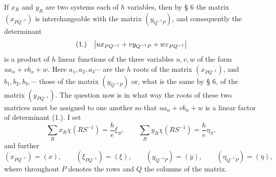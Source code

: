 \documentclass[11pt]{article}
\makeatletter
\newcommand{\frobtagc}[2]{\[\begin{array}{@{}r@{\quad}c@{}}\textup{(#1)} & \displaystyle #2\end{array}\]}
\makeatother
\begin{document}
If $x_R$ and $y_R$ are two systems each of $h$ variables, then by § 6 the matrix $(x_{PQ^{-1}})$ is interchangeable with the matrix $(y_{Q^{-1}P})$, and consequently the determinant
\frobtagc{1.}{\left|ux_{PQ^{-1}}+vy_{Q^{-1}P}+w\varepsilon_{PQ^{-1}}\right|}
is a product of $h$ linear functions of the three variables $u,v,w$ of the form $ua_\alpha+vb_\alpha+w$. Here $a_1,a_2,a_3\cdots$ are the $h$ roots of the matrix $(x_{PQ^{-1}})$, and $b_1,b_2,b_3,\cdots$ those of the matrix $(y_{Q^{-1}P})$ or, what is the same by § 6, of the matrix $(y_{PQ^{-1}})$. The question now is in what way the roots of these two matrices must be assigned to one another so that $ua_\alpha+vb_\alpha+w$ is a linear factor of determinant (1.). I set
\[
\sum_R x_R\chi(RS^{-1})=\frac{h}{e}\xi_S,
\qquad
\sum_R y_R\chi(RS^{-1})=\frac{h}{e}\eta_S,
\]
and further
\[
(x_{PQ^{-1}})=(x),\qquad (\xi_{PQ^{-1}})=(\xi),\qquad (y_{Q^{-1}P})=(\overline{y}),\qquad (\eta_{Q^{-1}P})=(\overline{\eta}),
\]
where throughout $P$ denotes the rows and $Q$ the columns of the matrix.
\end{document}
